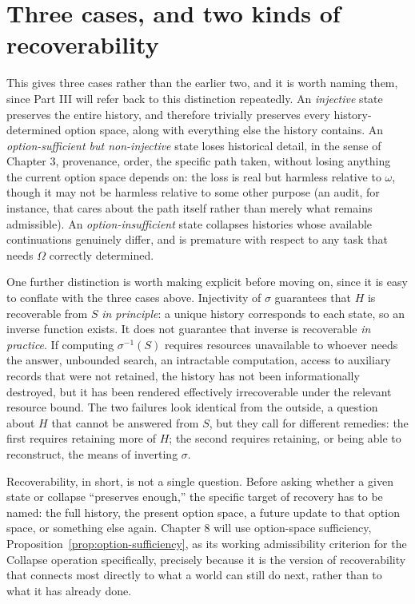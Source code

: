 \documentclass[11pt]{book}
\begin{document}
\section{Three cases, and two kinds of recoverability}

This gives three cases rather than the earlier two, and it is worth naming them, since Part III will refer back to this distinction repeatedly. An \emph{injective} state preserves the entire history, and therefore trivially preserves every history-determined option space, along with everything else the history contains. An \emph{option-sufficient but non-injective} state loses historical detail, in the sense of Chapter 3, provenance, order, the specific path taken, without losing anything the current option space depends on: the loss is real but harmless relative to $\omega$, though it may not be harmless relative to some other purpose (an audit, for instance, that cares about the path itself rather than merely what remains admissible). An \emph{option-insufficient} state collapses histories whose available continuations genuinely differ, and is premature with respect to any task that needs $\Omega$ correctly determined.

One further distinction is worth making explicit before moving on, since it is easy to conflate with the three cases above. Injectivity of $\sigma$ guarantees that $H$ is recoverable from $S$ \emph{in principle}: a unique history corresponds to each state, so an inverse function exists. It does not guarantee that inverse is recoverable \emph{in practice}. If computing $\sigma^{-1}(S)$ requires resources unavailable to whoever needs the answer, unbounded search, an intractable computation, access to auxiliary records that were not retained, the history has not been informationally destroyed, but it has been rendered effectively irrecoverable under the relevant resource bound. The two failures look identical from the outside, a question about $H$ that cannot be answered from $S$, but they call for different remedies: the first requires retaining more of $H$; the second requires retaining, or being able to reconstruct, the means of inverting $\sigma$.

Recoverability, in short, is not a single question. Before asking whether a given state or collapse ``preserves enough,'' the specific target of recovery has to be named: the full history, the present option space, a future update to that option space, or something else again. Chapter 8 will use option-space sufficiency, Proposition~\ref{prop:option-sufficiency}, as its working admissibility criterion for the Collapse operation specifically, precisely because it is the version of recoverability that connects most directly to what a world can still do next, rather than to what it has already done.
\end{document}
